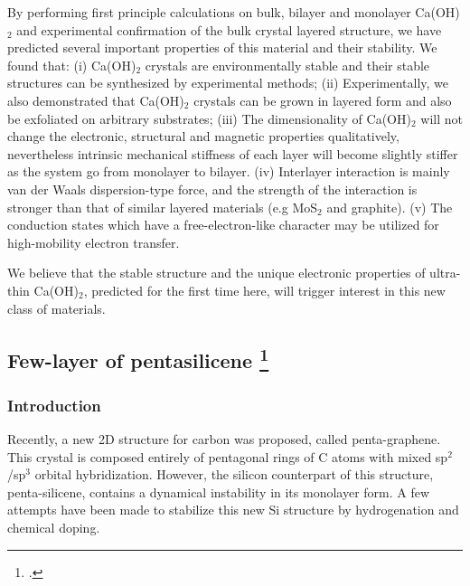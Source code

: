By performing first principle calculations on bulk, bilayer and 
monolayer Ca(OH)$_2$ and experimental confirmation of the bulk crystal 
layered structure, we have predicted several important properties of this 
material and their stability. We found that: (i) Ca(OH)$_2$ crystals are 
environmentally stable and their stable structures can be synthesized by 
experimental methods; (ii) Experimentally, we also demonstrated that Ca(OH)$_2$ 
crystals can be grown in layered form and also be exfoliated on arbitrary 
substrates; (iii) The dimensionality of Ca(OH)$_2$ will not change the 
electronic, structural and magnetic properties qualitatively, nevertheless 
intrinsic mechanical stiffness of each layer will become slightly stiffer as 
the system go from monolayer to bilayer. (iv) Interlayer interaction is mainly 
van der Waals dispersion-type force, and
the strength of the interaction is stronger than that of similar layered
materials (e.g MoS$_2$ and graphite). (v) The 
conduction states which have a free-electron-like character may be utilized for 
high-mobility electron transfer. 

We believe that the stable structure and the unique electronic properties of ultra-thin 
Ca(OH)$_2$, predicted for the first time here, will trigger interest in this 
new class of materials. 

\subsection[Few-layer of pentasilicene]{Few-layer of pentasilicene \footcite[This work is published in:][]{Aierken2016.pentasilicene}}

\subsubsection{Introduction\label{intro}}

Recently, a new 2D structure for carbon was proposed, called penta-graphene\cite{Zhang2015}. This crystal is composed entirely of pentagonal rings of C atoms with mixed sp$^2$/sp$^3$ orbital hybridization.  However, the silicon counterpart of this structure, penta-silicene, contains a dynamical instability in its monolayer form. A few attempts have been made to stabilize this new Si structure by hydrogenation\cite{Ding2015} and chemical doping\cite{Li2015b}. 

